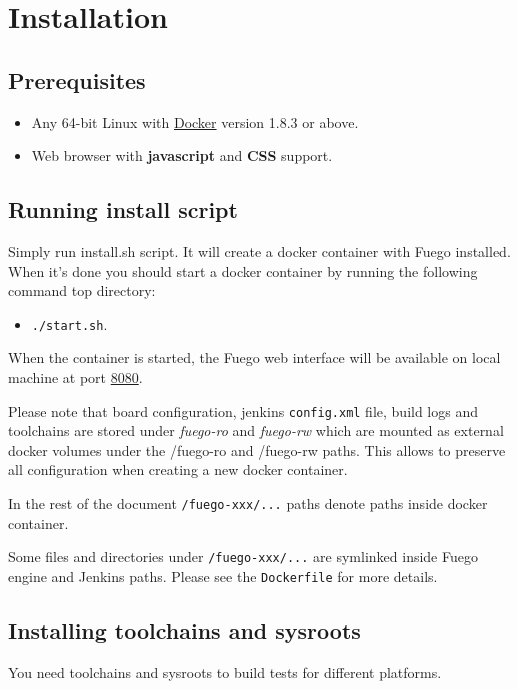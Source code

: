 \section{Installation}
\label{sec:install}

\subsection{Prerequisites}
\label{sec:prereq}

\begin{itemize}
\item Any 64-bit Linux with \href{https://www.docker.com/}{Docker} version 1.8.3 or above.
\item Web browser with \textbf{javascript} and \textbf{CSS} support.
\end{itemize}
\subsection{Running install script}
\label{sec:inst-steps}

Simply run install.sh script. It will create a docker container with Fuego installed. When it's done you should start a docker container by running the following command top directory:
\begin{itemize}
\item \texttt{./start.sh}.
\end{itemize}

When the container is started, the Fuego web interface will be available on local machine at port \href{http://localhost:8080}{8080}.

Please note that board configuration, jenkins \texttt{config.xml} file, build logs and toolchains are stored under \textit{fuego-ro} and \textit{fuego-rw} which are mounted as external docker volumes under the /fuego-ro and /fuego-rw paths. This allows to preserve all configuration when creating a new docker container.

In the rest of the document \texttt{/fuego-xxx/...} paths denote paths inside docker container.

Some files and directories under \texttt{/fuego-xxx/...} are symlinked inside Fuego engine and Jenkins paths. Please see the \texttt{Dockerfile} for more details.

\subsection{Installing toolchains and sysroots}
You need toolchains and sysroots to build tests for different platforms.
\label{sec:toolchain-install}
